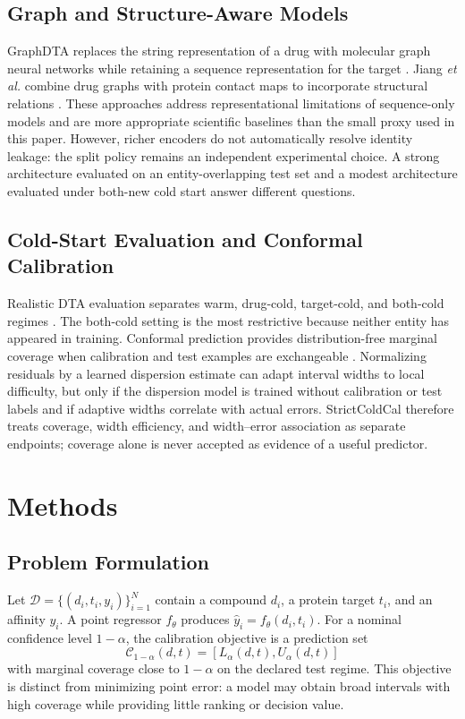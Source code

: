 \documentclass[lettersize,journal]{IEEEtran}
\begin{document}
\subsection{Graph and Structure-Aware Models}
GraphDTA replaces the string representation of a drug with molecular graph neural networks while retaining a sequence representation for the target \cite{graphdta}. Jiang \emph{et al.} combine drug graphs with protein contact maps to incorporate structural relations \cite{gnncontact}. These approaches address representational limitations of sequence-only models and are more appropriate scientific baselines than the small proxy used in this paper. However, richer encoders do not automatically resolve identity leakage: the split policy remains an independent experimental choice. A strong architecture evaluated on an entity-overlapping test set and a modest architecture evaluated under both-new cold start answer different questions.

\subsection{Cold-Start Evaluation and Conformal Calibration}
Realistic DTA evaluation separates warm, drug-cold, target-cold, and both-cold regimes \cite{pahikkala2015}. The both-cold setting is the most restrictive because neither entity has appeared in training. Conformal prediction provides distribution-free marginal coverage when calibration and test examples are exchangeable \cite{vovk2005,angelopoulos2023}. Normalizing residuals by a learned dispersion estimate can adapt interval widths to local difficulty, but only if the dispersion model is trained without calibration or test labels and if adaptive widths correlate with actual errors. StrictColdCal therefore treats coverage, width efficiency, and width--error association as separate endpoints; coverage alone is never accepted as evidence of a useful predictor.

\section{Methods}

\subsection{Problem Formulation}
Let $\mathcal{D}=\{(d_i,t_i,y_i)\}_{i=1}^{N}$ contain a compound $d_i$, a protein target $t_i$, and an affinity $y_i$. A point regressor $f_\theta$ produces $\hat y_i=f_\theta(d_i,t_i)$. For a nominal confidence level $1-\alpha$, the calibration objective is a prediction set
\begin{equation}
\mathcal{C}_{1-\alpha}(d,t)=\left[L_{\alpha}(d,t),U_{\alpha}(d,t)\right]
\end{equation}
with marginal coverage close to $1-\alpha$ on the declared test regime. This objective is distinct from minimizing point error: a model may obtain broad intervals with high coverage while providing little ranking or decision value.
\end{document}
